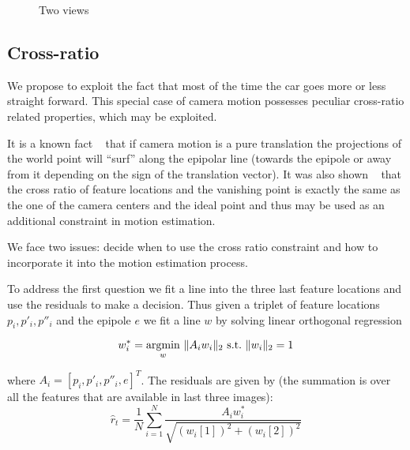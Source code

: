\documentclass[10pt]{article}         %
\DeclarePairedDelimiter\norm{\lVert}{\rVert}%
\begin{document}
\begin{figure}[!h]
  \centering
  \caption{Two views}
  \label{fig:two_views}
\end{figure}

\subsection{Cross-ratio}\label{sec:cross_ratio}

We propose to exploit the fact that most of the time the car goes more
or less straight forward.  This special case of camera motion
possesses peculiar cross-ratio related properties, which may be
exploited.

It is a known fact ~\cite{Hartley2004} that if camera motion is a pure
translation the projections of the world point will ``surf'' along the
epipolar line (towards the epipole or away from it depending on the
sign of the translation vector). It was also shown
~\cite{basri1999visual} that the cross ratio of feature locations and
the vanishing point is exactly the same as the one of the camera
centers and the ideal point and thus may be used as an additional
constraint in motion estimation.

We face two issues: decide when to use the cross ratio constraint and
how to incorporate it into the motion estimation process.

To address the first question we fit a line into the three last
feature locations and use the residuals to make a decision.  Thus
given a triplet of feature locations $p_i,p'_i,p''_i$ and the epipole
$e$ we fit a line $w$ by solving linear orthogonal regression

\[
w_i^* = \underset{w}{\text{argmin}} \ \norm{A_iw_i}_2\ \text{s.t.}\
\norm{w_i}_2=1
\]

where $A_i=[p_i,p'_i,p''_i,e]^T$.  The residuals are given by (the
summation is over all the features that are available in last three
images):
\begin{equation}\label{eq:puret}
  \hat{r}_t = \frac{1}{N} \sum_{i=1}^N \frac{A_iw_i^*}{\sqrt{(w_i[1])^2+(w_i[2])^2}}
\end{equation}
\end{document}
